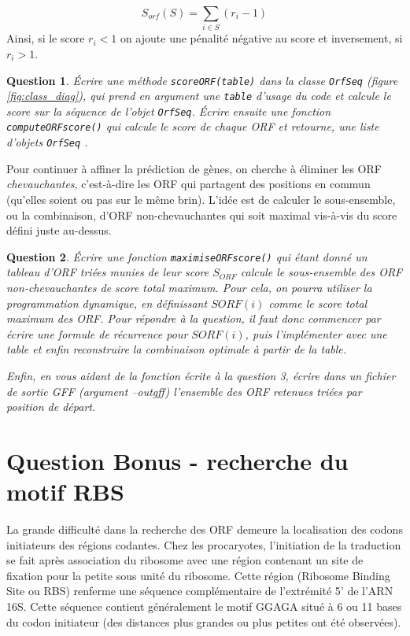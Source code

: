 \documentclass[10pt]{article}
\newtheorem{question}{Question}
\begin{document}
\begin{equation} \label{eq:eq_score}
    S_{orf}(S) = \sum_{i\in S} (r_i-1)
\end{equation}
Ainsi, si le score $r_{i} < 1$ on ajoute une pénalité négative au score et inversement, si $r_{i} > 1$.
\begin{question}
Écrire une méthode {\tt scoreORF(table)} dans la classe {\tt OrfSeq} (figure \ref{fig:class_diag}), qui prend en argument une {\tt table} d'usage du code et calcule le score sur la séquence de l'objet {\tt OrfSeq}.
Écrire ensuite une fonction {\tt computeORFscore()} qui calcule le score de chaque ORF et retourne, une liste d'objets {\tt OrfSeq} .
\end{question}

Pour continuer à affiner la prédiction de gènes, on cherche à éliminer les ORF {\em chevauchantes}, c'est-à-dire les ORF qui partagent des positions en commun (qu'elles soient ou pas sur le même brin). L'idée est de calculer le sous-ensemble, ou la combinaison, d'ORF non-chevauchantes qui soit maximal vis-à-vis du score défini juste au-dessus.

\begin{question}
Écrire une fonction {\tt maximiseORFscore()} qui étant donné un tableau d'ORF triées munies de leur score $S_{ORF}$ calcule le sous-ensemble des ORF non-chevauchantes de score total maximum. Pour cela, on pourra utiliser la programmation dynamique, en définissant $SORF(i)$ comme le score total maximum des ORF. Pour répondre à la question, il faut donc commencer par écrire une formule de récurrence pour $SORF(i)$, puis l'implémenter avec une table et enfin reconstruire la combinaison optimale à partir de la table.

Enfin, en vous aidant de la fonction écrite à la question 3, écrire dans un fichier de sortie GFF (argument --outgff) l'ensemble des ORF retenues triées par position de départ.
\end{question}

\section{Question Bonus - recherche du motif RBS}
La grande difficulté dans la recherche des ORF demeure la localisation des codons initiateurs des régions codantes.
Chez les procaryotes, l'initiation de la traduction se fait après association du ribosome avec une région contenant un site de fixation pour la petite sous unité du ribosome. Cette région (Ribosome Binding Site ou RBS) renferme une séquence complémentaire de l'extrémité 5' de l'ARN 16S. Cette séquence contient généralement le motif GGAGA situé à 6 ou 11 bases du codon initiateur (des distances plus grandes ou plus petites ont été observées).
\end{document}
